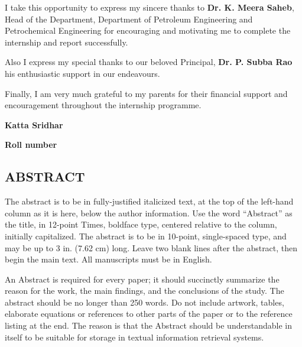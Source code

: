 \documentclass[11pt,a4paper]{article}
\begin{document}
\vspace{1em}

I take this opportunity to express my sincere thanks to \textbf{Dr. K. Meera Saheb}, Head of the Department, Department of Petroleum Engineering and Petrochemical Engineering for encouraging and motivating me to complete the internship and report successfully.

\vspace{1em}

Also I express my special thanks to our beloved Principal, \textbf{Dr. P. Subba Rao} his enthusiastic support in our endeavours.

\vspace{1em}

Finally, I am very much grateful to my parents for their financial support and encouragement throughout the internship programme.

\vspace{1em}

\hfill \textbf{Katta Sridhar}

\hfill \textbf{Roll number} \hspace{0.005\textwidth}
        
\newpage        
\tableofcontents



\newpage

\begin{center}
\section*{ABSTRACT}
\end{center}
  
The abstract is to be in fully-justified italicized text, at the top of the left-hand column as it is here, below the author information. Use the word “Abstract” as the title, in 12-point Times, boldface type, centered relative to the column, initially capitalized. The abstract is to be in 10-point, single-spaced type, and may be up to 3 in. (7.62 cm) long. Leave two blank lines after the abstract, then begin the main text. All manuscripts must be in English.
  
\vspace{2em}
  
An Abstract is required for every paper; it should succinctly summarize the reason for the work, the main findings, and the conclusions of the study. The abstract should be no longer than 250 words. Do not include artwork, tables, elaborate equations or references to other parts of the paper or to the reference listing at the end. The reason is that the Abstract should be understandable in itself to be suitable for storage in textual information retrieval systems.
  
\end{document}
